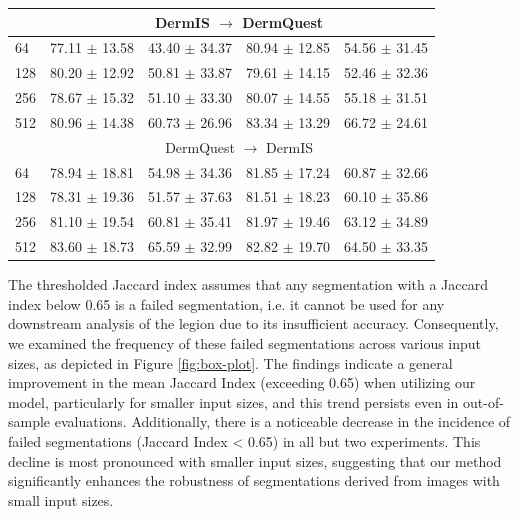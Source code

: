 \begin{table}[t!]
\begin{tabularx}{\textwidth}{X|cc|cc}
\midrule
 &\multicolumn{4}{c}{DermIS $\rightarrow$ DermQuest} \\
\midrule
 64                                                       & 77.11 $\pm$ 13.58 & 43.40 $\pm$ 34.37 & 80.94 $\pm$ 12.85 & 54.56 $\pm$ 31.45 \\
 128                                                      & 80.20 $\pm$ 12.92 & 50.81 $\pm$ 33.87 & 79.61 $\pm$ 14.15 & 52.46 $\pm$ 32.36 \\
 256                                                      & 78.67 $\pm$ 15.32 & 51.10 $\pm$ 33.30 & 80.07 $\pm$ 14.55 & 55.18 $\pm$ 31.51 \\
 512                                                      & 80.96 $\pm$ 14.38 & 60.73 $\pm$ 26.96 & 83.34 $\pm$ 13.29 & 66.72 $\pm$ 24.61 \\
\midrule
 &\multicolumn{4}{c}{DermQuest $\rightarrow$ DermIS} \\
\midrule
 64                                                       & 78.94 $\pm$ 18.81 & 54.98 $\pm$ 34.36 & 81.85 $\pm$ 17.24 & 60.87 $\pm$ 32.66 \\
 128                                                      & 78.31 $\pm$ 19.36 & 51.57 $\pm$ 37.63 & 81.51 $\pm$ 18.23 & 60.10 $\pm$ 35.86 \\
 256                                                      & 81.10 $\pm$ 19.54 & 60.81 $\pm$ 35.41 & 81.97 $\pm$ 19.46 & 63.12 $\pm$ 34.89 \\
 512                                                      & 83.60 $\pm$ 18.73 & 65.59 $\pm$ 32.99 & 82.82 $\pm$ 19.70 & 64.50 $\pm$ 33.35 \\
\end{tabularx}
\end{table}

The thresholded Jaccard index assumes that any segmentation with a Jaccard index below 0.65 is a failed segmentation, i.e. it cannot be used for any downstream analysis of the legion due to its insufficient accuracy. Consequently, we examined the frequency of these failed segmentations across various input sizes, as depicted in Figure \ref{fig:box-plot}. The findings indicate a general improvement in the mean Jaccard Index (exceeding 0.65) when utilizing our model, particularly for smaller input sizes, and this trend persists even in out-of-sample evaluations. Additionally, there is a noticeable decrease in the incidence of failed segmentations (Jaccard Index < 0.65) in all but two experiments. This decline is most pronounced with smaller input sizes, suggesting that our method significantly enhances the robustness of segmentations derived from images with small input sizes.

